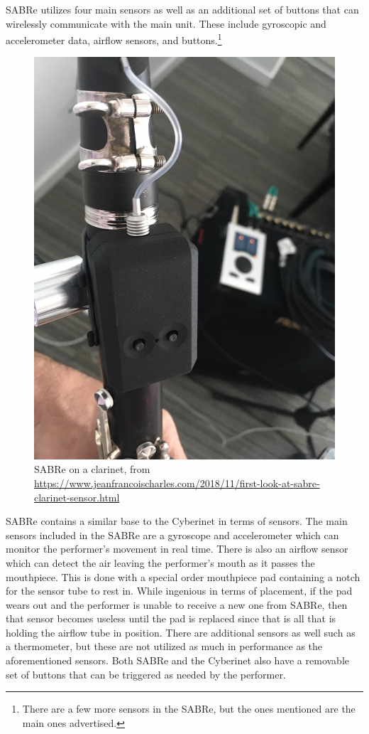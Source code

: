 SABRe utilizes four main sensors as well as an additional set of buttons that can wirelessly communicate with the main unit. These include gyroscopic and accelerometer data, airflow sensors, and buttons.\footnote{There are a few more sensors in the SABRe, but the ones mentioned are the main ones advertised.}

\begin{figure}
    \centering
    \includegraphics[scale=0.2]{diagrams/sabre-right-hand.jpg}
    \caption{SABRe on a clarinet, from \url{https://www.jeanfrancoischarles.com/2018/11/first-look-at-sabre-clarinet-sensor.html}}
    \label{fig:SABRe} %
\end{figure}


SABRe contains a similar base to the Cyberinet in terms of sensors. The main sensors included in the SABRe are a gyroscope and accelerometer which can monitor the performer's movement in real time. There is also an airflow sensor which can detect the air leaving the performer's mouth as it passes the mouthpiece. This is done with a special order mouthpiece pad containing a notch for the sensor tube to rest in. While ingenious in terms of placement, if the pad wears out and the performer is unable to receive a new one from SABRe, then that sensor becomes useless until the pad is replaced since that is all that is holding the airflow tube in position. There are additional sensors as well such as a thermometer, but these are not utilized as much in performance as the aforementioned sensors. Both SABRe and the Cyberinet also have a removable set of buttons that can be triggered as needed by the performer.


